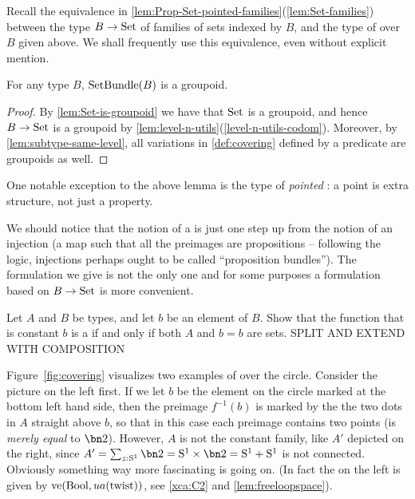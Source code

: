 Recall the equivalence in \cref{lem:Prop-Set-pointed-families}(\ref{lem:Set-families})
between the type $B\to\mathrm{Set}$ of families of sets indexed by $B$, and the type
of \coverings over $B$ given above.
We shall frequently use this equivalence, even without explicit mention.

\begin{lemma}\label{lem:setbundle-is-groupoid}
For any type $B$, $\mathrm{SetBundle}(B)$ is a groupoid.
\end{lemma}
\begin{proof}
By \cref{lem:Set-is-groupoid} we have that $\mathrm{Set}$ is a groupoid, 
and hence $B\to\mathrm{Set}$ is a groupoid by \cref{lem:level-n-utils}(\ref{level-n-utils-codom}).
Moreover, by \cref{lem:subtype-same-level}, all variations in \cref{def:covering}
defined by a predicate are groupoids as well.
\end{proof}
One notable exception to the above lemma is the type of \emph{pointed} \coverings:
a point is extra structure, not just a property.

We should notice that the notion of a \covering is just one step up from the notion of an
injection (a map such that all the preimages are propositions -- 
following the logic, injections perhaps ought to be called ``proposition bundles''). 
The formulation we give is not the only one and for some purposes a formulation
based on $B\to\mathrm{Set}$ is more convenient.

\begin{xca}\label{xca:constant-cover}
Let $A$ and $B$ be types, and let $b$ be an element of $B$.
Show that the function that is constant $b$ is a \covering
if and only if both $A$ and $b=b$ are sets. SPLIT AND EXTEND WITH COMPOSITION
\end{xca}

Figure~\ref{fig:covering} visualizes two examples of \coverings over the circle.  
Consider the picture on the left first.  
If we let $b$ be the element on the circle marked at the bottom left hand side, 
then the preimage $f^{-1}(b)$ is marked by the the two dots in $A$ straight above $b$, 
so that in this case each preimage contains two points (is \emph{merely equal} to $\bn 2$).  
However, $A$ is not the constant family, like $A'$ depicted on the right, since 
$A'=\sum_{z:\Sc}\bn 2=\Sc\times\bn 2=\Sc+\Sc$ is not connected.  
Obviously something way more fascinating is going on.
(In fact the \covering on the left is given by $\ve(\bool,ua(\twist))$,
see \cref{xca:C2} and \cref{lem:freeloopspace}).

